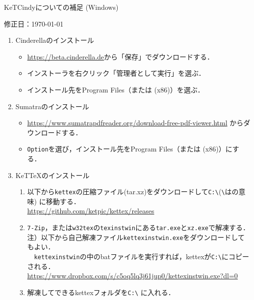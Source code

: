 \documentclass{ujarticle}
\begin{document}
\begin{center}
KeTCindyについての補足 (Windows)
\end{center}

\hfill 修正日：\today

\begin{enumerate}[\bf\large 1.]

\item Cinderellaのインストール
\begin{itemize}
\item \url{https://beta.cinderella.de}から「保存」でダウンロードする．
\item インストーラを右クリック「管理者として実行」を選ぶ．
\item インストール先をProgram Files（または (x86)）を選ぶ．
\end{itemize}

\item Sumatraのインストール
\begin{itemize}
\item \url{https://www.sumatrapdfreader.org/download-free-pdf-viewer.html} からダウンロードする．
\item {\color{red}\verb|Option|を選び}，インストール先をProgram Files（または (x86)）にする．
\end{itemize}

\item KeTTeXのインストール

\begin{enumerate}[(1)]
\item 以下から\verb|kettex|の圧縮ファイル(tar.xz)をダウンロードして\verb|C:\|(\verb|\|は\yen の意味) に移動する．\\
    \hspace*{10mm}\url{https://github.com/ketpic/kettex/releases}
\item \verb|7-Zip|，または\verb|w32tex|の\verb|texinstwin|にある\verb|tar.exe|と\verb|xz.exe|で解凍する．\\
注）以下から自己解凍ファイル\verb|kettexinstwin.exe|をダウンロードしてもよい．\\
　\verb|kettexinstwin|の中のbatファイルを実行すれば，kettexが\verb|C:\|にコピーされる．\\
\hspace*{10mm}\url{https://www.dropbox.com/s/c5oq5lq3j61jup0/kettexinstwin.exe?dl=0}

\item 解凍してできるkettexフォルダを\verb|C:\| に入れる．
\end{enumerate}


\end{enumerate}
\end{document}

